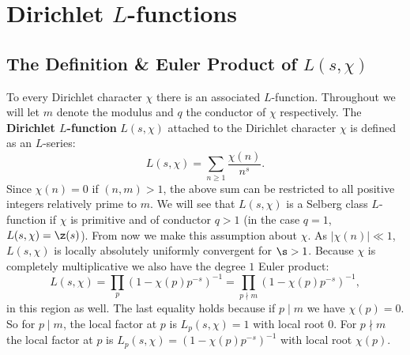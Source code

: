   \section{Dirichlet \texorpdfstring{$L$}{L}-functions}
    \subsection*{The Definition \& Euler Product of \texorpdfstring{$L(s,\chi)$}{L(s,\chi)}}
      To every Dirichlet character $\chi$ there is an associated $L$-function. Throughout we will let $m$ denote the modulus and $q$ the conductor of $\chi$ respectively. The \textbf{Dirichlet $L$-function} $L(s,\chi)$ attached to the Dirichlet character $\chi$ is defined as an $L$-series:
      \[
        L(s,\chi) = \sum_{n \ge 1}\frac{\chi(n)}{n^{s}}.
      \]
      Since $\chi(n) = 0$ if $(n,m) > 1$, the above sum can be restricted to all positive integers relatively prime to $m$. We will see that $L(s,\chi)$ is a Selberg class $L$-function if $\chi$ is primitive and of conductor $q > 1$ (in the case $q = 1$, $L(s,\chi) = \z(s)$). From now we make this assumption about $\chi$. As $|\chi(n)| \ll 1$, $L(s,\chi)$ is locally absolutely uniformly convergent for $\s > 1$. Because $\chi$ is completely multiplicative we also have the degree $1$ Euler product:
      \[
        L(s,\chi) = \prod_{p}(1-\chi(p)p^{-s})^{-1} = \prod_{p \nmid m}(1-\chi(p)p^{-s})^{-1},
      \]
      in this region as well. The last equality holds because if $p \mid m$ we have $\chi(p) = 0$. So for $p \mid m$, the local factor at $p$ is $L_{p}(s,\chi) = 1$ with local root $0$. For $p \nmid m$ the local factor at $p$ is $L_{p}(s,\chi) = (1-\chi(p)p^{-s})^{-1}$ with local root $\chi(p)$.
